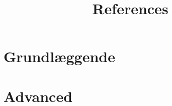 \documentclass[10pt,a4paper,oneside]{report}
\begin{document}
\newpage
\tableofcontents
\newpage

\chapter{Grundlæggende}
\newpage
\newpage
\newpage
\newpage

\chapter{Advanced}
\newpage
\newpage
\newpage
\newpage

\newpage

\appendix

\newpage

\title{References}


\end{document}
